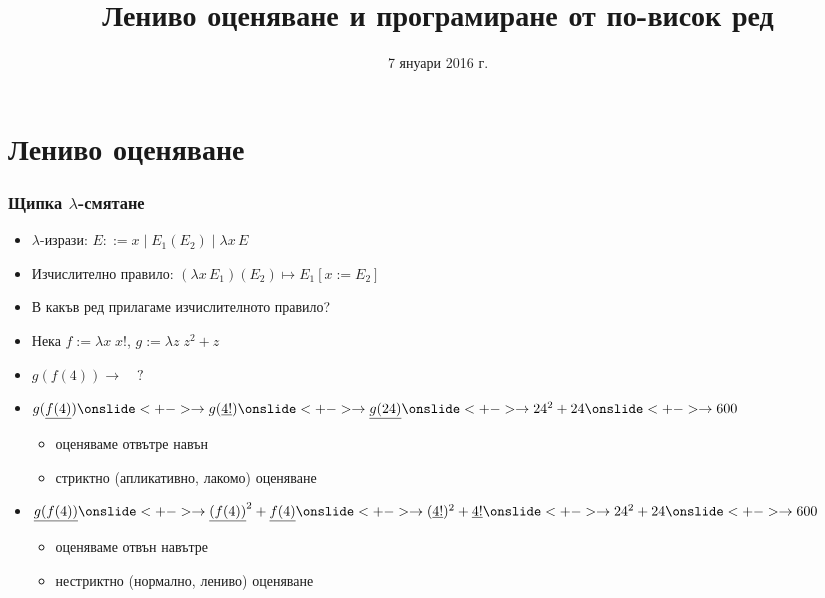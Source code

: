 \documentclass{beamer}
\title[Лениво оценяване]{Лениво оценяване и програмиране от по-висок ред}
\date{7 януари 2016 г.}
\begin{document}
\begin{frame}
  \titlepage
\end{frame}

\section{Лениво оценяване}

\begin{frame}
  \frametitle{Щипка $\lambda$-смятане}
  \newcommand{\lra}{\rightarrow}
  \begin{itemize}[<+->]
  \item $\lambda$-изрази: $E ::= x \;|\; E_1(E_2) \;|\; \lambda x\, E$
  \item Изчислително правило: $(\lambda x\,E_1)(E_2) \mapsto E_1[x := E_2]$
  \item В какъв ред прилагаме изчислителното правило?
  \item Нека $f := \lambda x\; x!$, $g := \lambda z\;z^2+z$
  \item $g(f(4)) \lra \quad ?$
  \item $g(\underline{f(4)})
    \onslide<+->
    \lra g(\underline{4!})
    \onslide<+->
    \lra \underline{g(24)}
    \onslide<+->
    \lra 24^2 + 24
    \onslide<+->
    \lra 600$
    \begin{itemize}
    \item<16-> оценяваме \alert{отвътре навън}
    \item<17-> \alert{стриктно} (апликативно, лакомо) оценяване
    \end{itemize}
  \item $\underline{g(f(4))}
    \onslide<+->
    \lra \underline{(f(4))}^2 + \underline{f(4)}
    \onslide<+->
    \lra (\underline{4!})^2 + \underline{4!}
    \onslide<+->
    \lra 24^2 + 24
    \onslide<+->
    \lra 600$
    \begin{itemize}
    \item<16-> оценяваме \alert{отвън навътре}
    \item<17-> \alert{нестриктно} (нормално, лениво) оценяване
    \end{itemize}
  \end{itemize}
\end{frame}
\end{document}
